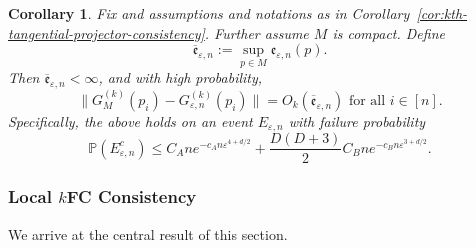 \documentclass{article}
\let\todo\undefined
\let\todo\undefined
\newcommand{\todo}[1][]{}
\newtheorem{corollary}[theorem]{Corollary}
\theoremstyle{remark}
\theoremstyle{plain}
\begin{document}
\begin{corollary}
\label{cor:kth-tangential-projector-compactness-corollary}
    Fix and assumptions and notations as in Corollary~\ref{cor:kth-tangential-projector-consistency}. Further assume \( M \) is \emph{compact}. Define \[\overline{\mathfrak{e}}_{\varepsilon,n}:=\sup_{p\in M} \mathfrak{e}_{\varepsilon,n}(p).\] Then \( \overline{\mathfrak{e}}_{\varepsilon, n} <\infty \), and with high probability,
\[ \|G_{M}^{(k)}(p_{i}) - G_{\varepsilon, n}^{(k)}(p_{i})\|=O_{ k}(\overline{\mathfrak{e}}_{\varepsilon, n})   \text{ for all } i\in[n].\]
Specifically, the above holds on an event \(E_{\varepsilon,n}\) with failure probability
\[
\mathbb{P}(E_{\varepsilon,n}^{c})
\le
C_{A} n e^{-c_{A}n \varepsilon^{4+d/2}}
+
\frac{D(D+3)}{2} C_{B} n e^{-c_{B}n \varepsilon^{3+d/2}}.
\]


    
\end{corollary}





\subsubsection{Local \( k \)FC Consistency}
\label{subsubsec:local-kfc-consistency}


We arrive at the central result of this section.%
\end{document}
